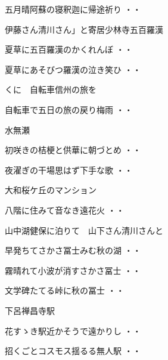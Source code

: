 \begin{shiika}五月晴阿蘇の寝釈迦に帰途祈り
\hfill{・・}\end{shiika}
\vspace{0.6cm}
伊藤さん清川さん」と寄居少林寺五百羅漢
\begin{shiika}夏草に五百羅漢のかくれんぼ
\hfill{・・}\end{shiika}
\begin{shiika}夏草にあそびつ羅漢の泣き笑ひ
\hfill{・・}\end{shiika}
\vspace{0.6cm}
くに　自転車信州の旅を
\begin{shiika}自転車で五日の旅の戻り梅雨
\hfill{・・}\end{shiika}
\vspace{0.6cm}
水無瀬
\begin{shiika}初咲きの桔梗と供華に朝づとめ
\hfill{・・}\end{shiika}
\begin{shiika}夜濯ぎの干場思はず下手な歌
\hfill{・・}\end{shiika}
\vspace{0.6cm}
大和桜ケ丘のマンション
\begin{shiika}八階に住みて音なき遠花火
\hfill{・・}\end{shiika}
\vspace{0.6cm}
山中湖健保に泊りて　山下さん清川さんと
\begin{shiika}早発ちてさかさ冨士みむ秋の湖
\hfill{・・}\end{shiika}
\begin{shiika}霧晴れて小波が消すさかさ冨士
\hfill{・・}\end{shiika}
\begin{shiika}文学碑たてる峠に秋の冨士
\hfill{・・}\end{shiika}
\vspace{0.6cm}
下呂禅昌寺駅
\begin{shiika}花すゝき駅近かそうで遠かりし
\hfill{・・}\end{shiika}
\begin{shiika}招くごとコスモス揺るる無人駅
\hfill{・・}\end{shiika}
